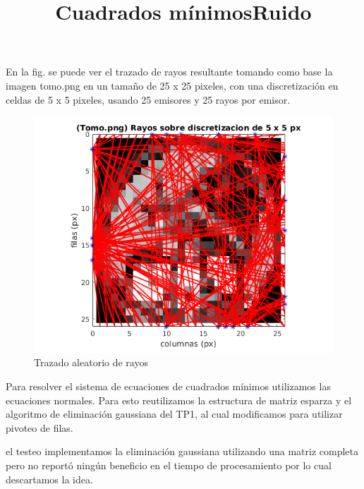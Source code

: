 \par En la fig. se puede ver el trazado de rayos resultante tomando como base la imagen tomo.png en un tamaño de 25 x 25 pixeles, con una discretización en celdas de 5 x 5 pixeles, usando 25 emisores y 25 rayos por emisor.

\begin{figure}[H] 
\centering
\includegraphics[width=1\textwidth]{img/rayos_tomo25x25px.png}
\caption{Trazado aleatorio de rayos}
\label{fig:rayos aleatorios}
\end{figure}

\title{Cuadrados mínimos} Para resolver el sistema de ecuaciones de cuadrados mínimos utilizamos las ecuaciones normales. Para esto reutilizamos la estructura de matriz esparza y el algoritmo de eliminación gaussiana del TP1, al cual modificamos para utilizar pivoteo de filas.

\Durante el testeo implementamos la eliminación gaussiana utilizando una matriz completa pero no reportó ningún beneficio en el tiempo de procesamiento por lo cual descartamos la idea.

\title{Ruido}
